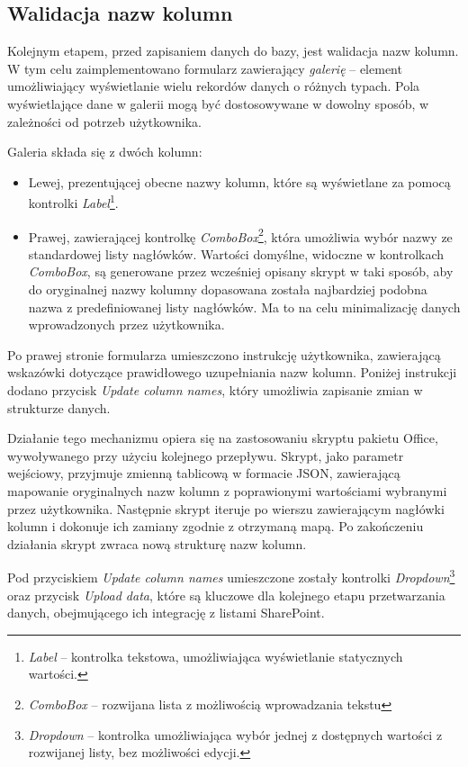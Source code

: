 \subsection{Walidacja nazw kolumn} Kolejnym etapem, przed zapisaniem danych do bazy, jest walidacja nazw kolumn. W tym celu zaimplementowano formularz zawierający \emph{galerię} -- element umożliwiający wyświetlanie wielu rekordów danych o różnych typach. Pola wyświetlające dane w galerii mogą być dostosowywane w dowolny sposób, w zależności od potrzeb użytkownika.

\noindent Galeria składa się z dwóch kolumn:
\begin{itemize}
    \item Lewej, prezentującej obecne nazwy kolumn, które są wyświetlane za pomocą kontrolki \emph{Label}\footnote{\emph{Label} -- kontrolka tekstowa, umożliwiająca wyświetlanie statycznych wartości.}.
    \item Prawej, zawierającej kontrolkę \emph{ComboBox}\footnote{\emph{ComboBox} -- rozwijana lista z możliwością wprowadzania tekstu}, która umożliwia wybór nazwy ze standardowej listy nagłówków. Wartości domyślne, widoczne w kontrolkach \emph{ComboBox}, są generowane przez wcześniej opisany skrypt w taki sposób, aby do oryginalnej nazwy kolumny dopasowana została najbardziej podobna nazwa z predefiniowanej listy nagłówków. Ma to na celu minimalizację danych wprowadzonych przez użytkownika.
\end{itemize}

Po prawej stronie formularza umieszczono instrukcję użytkownika, zawierającą wskazówki dotyczące prawidłowego uzupełniania nazw kolumn. Poniżej instrukcji dodano przycisk \emph{Update column names}, który umożliwia zapisanie zmian w strukturze danych.

\noindent Działanie tego mechanizmu opiera się na zastosowaniu skryptu pakietu Office, wywoływanego przy użyciu kolejnego przepływu. Skrypt, jako parametr wejściowy, przyjmuje zmienną tablicową w formacie JSON, zawierającą mapowanie oryginalnych nazw kolumn z poprawionymi wartościami wybranymi przez użytkownika. Następnie skrypt iteruje po wierszu zawierającym nagłówki kolumn i dokonuje ich zamiany zgodnie z otrzymaną mapą. Po zakończeniu działania skrypt zwraca nową strukturę nazw kolumn.

Pod przyciskiem \emph{Update column names} umieszczone zostały kontrolki \emph{Dropdown}\footnote{\emph{Dropdown} -- kontrolka umożliwiająca wybór jednej z dostępnych wartości z rozwijanej listy, bez możliwości edycji.} oraz przycisk \emph{Upload data}, które są kluczowe dla kolejnego etapu przetwarzania danych, obejmującego ich integrację z listami SharePoint.


